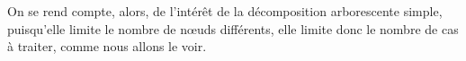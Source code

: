
On se rend compte, alors, de l'intérêt de la décomposition arborescente simple, puisqu'elle limite
le nombre de n\oe uds différents, elle limite donc le nombre de cas à traiter, comme nous allons le
voir.


